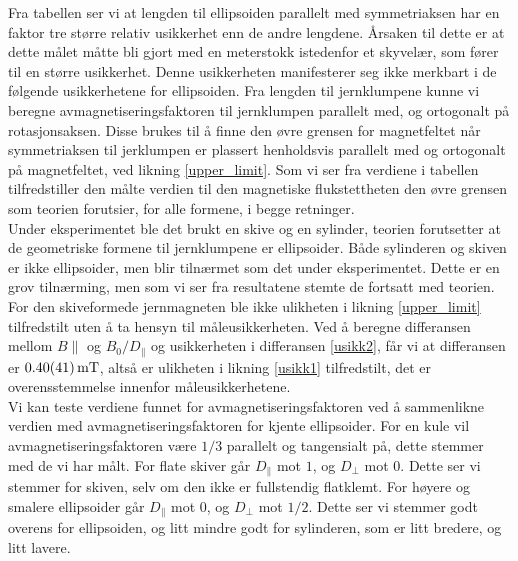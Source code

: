 \documentclass[%
 reprint,
 amsmath,amssymb,
 aps,
 norsk,
]{revtex4-1}
\begin{document}
Fra tabellen ser vi at lengden til ellipsoiden parallelt med symmetriaksen har en faktor tre større relativ usikkerhet enn de andre lengdene. Årsaken til dette er at dette målet måtte bli gjort med en meterstokk istedenfor et skyvelær, som fører til en større usikkerhet. Denne usikkerheten manifesterer seg ikke merkbart i de følgende usikkerhetene for ellipsoiden. Fra lengden til jernklumpene kunne vi beregne avmagnetiseringsfaktoren til jernklumpen parallelt med, og ortogonalt på rotasjonsaksen. Disse brukes til å finne den øvre grensen for magnetfeltet når symmetriaksen til jerklumpen er plassert henholdsvis parallelt med og ortogonalt på magnetfeltet, ved likning \eqref{upper_limit}. Som vi ser fra verdiene i tabellen tilfredstiller den målte verdien til den magnetiske flukstettheten den øvre grensen som teorien forutsier, for alle formene, i begge retninger.\\
Under eksperimentet ble det brukt en skive og en sylinder, teorien forutsetter at de geometriske formene til jernklumpene er ellipsoider. Både sylinderen og skiven er ikke ellipsoider, men blir tilnærmet som det under eksperimentet. Dette er en grov tilnærming, men som vi ser fra resultatene stemte de fortsatt med teorien. For den skiveformede jernmagneten ble ikke ulikheten i likning \eqref{upper_limit} tilfredstilt uten å ta hensyn til måleusikkerheten. Ved å beregne differansen mellom $B\parallel$ og $B_0/D_{\parallel}$ og usikkerheten i differansen \eqref{usikk2}, får vi at differansen er $\SI{0.4\pm0.41}{\milli\tesla}$, altså er ulikheten i likning \eqref{usikk1} tilfredstilt, det er overensstemmelse innenfor måleusikkerhetene.\\
Vi kan teste verdiene funnet for avmagnetiseringsfaktoren ved å sammenlikne verdien med avmagnetiseringsfaktoren for kjente ellipsoider. For en kule vil avmagnetiseringsfaktoren være $1/3$ parallelt og tangensialt på, dette stemmer med de vi har målt. For flate skiver går $D_{\parallel}$ mot $1$, og $D_{\perp}$ mot $0$. Dette ser vi stemmer for skiven, selv om den ikke er fullstendig flatklemt. For høyere og smalere ellipsoider går $D_{\parallel}$ mot $0$, og $D_{\perp}$ mot $1/2$. Dette ser vi stemmer godt overens for ellipsoiden, og litt mindre godt for sylinderen, som er litt bredere, og litt lavere.
\par
\end{document}
